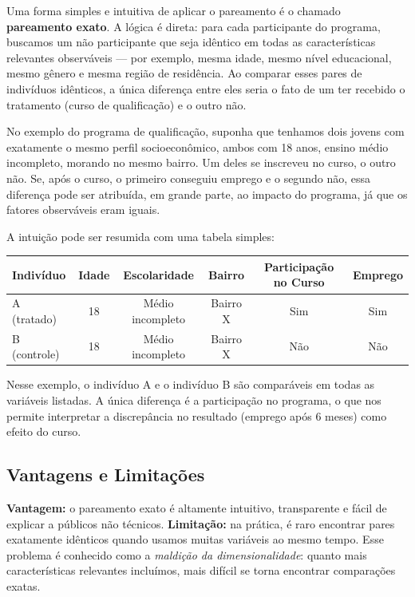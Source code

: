 Uma forma simples e intuitiva de aplicar o pareamento é o chamado \textbf{pareamento exato}. 
A lógica é direta: para cada participante do programa, buscamos um não participante que seja idêntico em todas as características relevantes observáveis — por exemplo, mesma idade, mesmo nível educacional, mesmo gênero e mesma região de residência. 
Ao comparar esses pares de indivíduos idênticos, a única diferença entre eles seria o fato de um ter recebido o tratamento (curso de qualificação) e o outro não.  

No exemplo do programa de qualificação, suponha que tenhamos dois jovens com exatamente o mesmo perfil socioeconômico, ambos com 18 anos, ensino médio incompleto, morando no mesmo bairro. 
Um deles se inscreveu no curso, o outro não. 
Se, após o curso, o primeiro conseguiu emprego e o segundo não, essa diferença pode ser atribuída, em grande parte, ao impacto do programa, já que os fatores observáveis eram iguais.  

A intuição pode ser resumida com uma tabela simples:

\begin{center}
\begin{tabular}{lccccc}
\hline
Indivíduo & Idade & Escolaridade & Bairro & Participação no Curso & Emprego\\
\hline
A (tratado) & 18 & Médio incompleto & Bairro X & Sim & Sim \\
B (controle) & 18 & Médio incompleto & Bairro X & Não & Não \\
\hline
\end{tabular}
\end{center}

Nesse exemplo, o indivíduo A e o indivíduo B são comparáveis em todas as variáveis listadas. 
A única diferença é a participação no programa, o que nos permite interpretar a discrepância no resultado (emprego após 6 meses) como efeito do curso.  

\subsection*{Vantagens e Limitações}
\textbf{Vantagem:} o pareamento exato é altamente intuitivo, transparente e fácil de explicar a públicos não técnicos.  
\textbf{Limitação:} na prática, é raro encontrar pares exatamente idênticos quando usamos muitas variáveis ao mesmo tempo. 
Esse problema é conhecido como a \textit{maldição da dimensionalidade}: quanto mais características relevantes incluímos, mais difícil se torna encontrar comparações exatas.  

